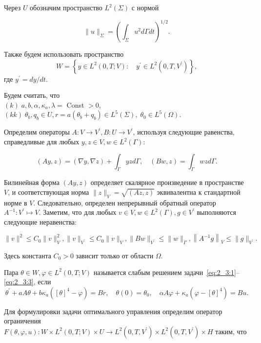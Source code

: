 Через $U$ обозначим пространство $L^{2}(\Sigma)$ с нормой

\[ \|u\|_{\Sigma}=\left(\int_{\Sigma} u^{2} d \Gamma d t\right)^{1 / 2}. \]


Также будем использовать пространство
\[
    W=\left\{y \in L^{2}(0, T ; V): \quad y^{\prime}
    \in L^{2}\left(0, T, V^{\prime}\right)\right\},
\]
где $y^{\prime}=d y / d t$.

Будем считать, что \\
$(k)\; a, b, \alpha, \kappa_{a}, \lambda=$ Const $>0$, \\
$(kk)\; \theta_{b}, q_{b} \in U, r=a\left(\theta_{b}+q_{b}\right)
\in L^{5}(\Sigma), \; \theta_{0} \in L^{5}(\Omega)$.


Определим операторы $A: V \rightarrow V^{\prime}, B: U \rightarrow V^{\prime}$,
используя следующие равенства, справедливые для любых
$y, z \in V, w \in L^{2}(\Gamma)$:

\[
    (A y, z)=(\nabla y, \nabla z)+\int_{\Gamma} y z d \Gamma,
    \quad(B w, z)=\int_{\Gamma} w z d \Gamma.
\]

Билинейная форма $(A y, z)$ определяет скалярное произведение в пространстве $V$,
и соответствующая норма $\|z\|_{V}=\sqrt{(A z, z)}$ эквивалентна к стандартной норме в $V$.
Следовательно, определен непрерывный обратный оператор $A^{-1}: V^{\prime} \mapsto V$.
Заметим, что для любых $v \in V, w \in L^{2}(\Gamma), g \in V^{\prime}$
выполняются следующие неравенства:

\[
    \|v\|^{2} \leq C_{0}\|v\|_{V}^{2},\|v\|_{V^{\prime}} \leq C_{0}\|v\|_{V},\|B w\|_{V^{\prime}}
    \leq\|w\|_{\Gamma},\left\|A^{-1} g\right\|_{V} \leq\|g\|_{V^{\prime}}.
\]

Здесь константа $C_{0}>0$ зависит только от области $\Omega$.

\begin{definition}
    Пара $\theta \in W, \varphi \in L^{2}(0, T ; V)$ называется слабым
    решением задачи~\eqref{eq:2_3:1}--\eqref{eq:2_3:3}, если
    \begin{equation}
        \label{eq:2_3:6}
        \theta^{\prime}+a A \theta+b \kappa_{a}\left([\theta]^{4}-\varphi\right)=B r,
        \quad \theta(0)=\theta_{0}, \quad \alpha A \varphi
        + \kappa_{a}\left(\varphi-[\theta]^{4}\right)=B u.
    \end{equation}
\end{definition}

Для формулировки задачи оптимального управления определим оператор ограничения
$F(\theta, \varphi, u): W \times L^{2}(0, T; V) \times U
\rightarrow L^{2} \left(0, T, V^{\prime}\right)
\times L^{2}\left(0, T, V^{\prime}\right) \times H$ таким, что


